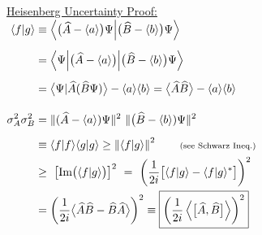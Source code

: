 \documentclass[12pt]{article}
\begin{document}
\vfill
\noindent
\begin{minipage}[t]{0.6\textwidth}
    \underline{Heisenberg Uncertainty Proof:} \\[5pt]
    \( \begin{aligned}
        \langle f|g \rangle & \equiv 
            \Big\langle \big( \widehat{A} - \langle a \rangle \big) \Psi 
            \Big| \big( \widehat{B} - \langle b \rangle \big) \Psi \Big\rangle
            \\[5pt]
        & = \Bigl\langle \Psi \Bigl| \big( \widehat{A} - \langle a \rangle \big) \Bigr|
            \bigl( \widehat{B} - \langle b \rangle \bigr) \Psi \Bigr\rangle
            \\[5pt]
        & = \big\langle \Psi | \widehat{A} (\widehat{B} \Psi) \big\rangle 
            - \langle a \rangle \langle b \rangle
            = \big\langle \widehat{A}\widehat{B} \big\rangle 
            - \langle a \rangle \langle b \rangle
            \\[10pt]
        \sigma_A^2 \sigma_B^2 & =
            \Vert ( \widehat{{A}} - \langle {a} \rangle ) {\Psi} \Vert^2
            \ \Vert \big( \widehat{{B}} - \langle {b} \rangle ) {\Psi} \Vert^2
            \\[5pt]
        & \equiv \langle f|f \rangle \langle g|g \rangle 
            \geq \left\Vert \langle f|g \rangle \right\Vert^2 
            \hspace{20pt} \text{\scriptsize(see Schwarz Ineq.)}
            \\
        & \geq \ \big[ \text{Im} \big( \langle f|g \rangle \big) \big]^2 \ 
            = \ \left( \frac{1}{2i} \big[ \langle f|g \rangle 
            - \langle f|g \rangle^* \big] \right)^2 
            \\
        & = \left( \frac{1}{2i} \big\langle \widehat{A}\widehat{B} 
            - \widehat{B}\widehat{A} \big\rangle \right)^2 
            \equiv \boxed{ \left( \frac{1}{2i} \left\langle 
            \big[ \widehat{A},\widehat{B} \big] \right\rangle \right)^2 }
    \end{aligned} \)
\end{minipage}
\hfill
\end{document}
